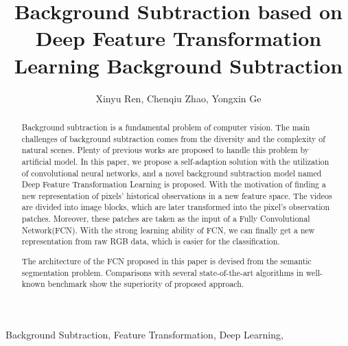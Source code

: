 \documentclass[journal]{IEEEtran}
\begin{document}
\title{Background Subtraction based on Deep Feature Transformation Learning Background Subtraction}

\author{Xinyu Ren,
        Chenqiu Zhao,
		Yongxin Ge }


\maketitle


\begin{abstract}
Background subtraction is a fundamental problem of computer vision.
The main challenges of background subtraction comes from the diversity and the complexity of natural scenes.
Plenty of previous works are proposed to handle this problem by artificial model.
In this paper,
we propose a self-adaption solution with the utilization of convolutional neural networks, 
and a novel background subtraction model named Deep Feature Transformation Learning is proposed.
With the motivation of finding a new representation of pixels’ historical observations in a new feature space.
The videos are divided into image blocks, which are later transformed into the pixel’s observation patches.
Moreover, these patches are taken as the input of a Fully Convolutional Network(FCN). 
With the strong learning ability of FCN, we can finally get a new representation from raw RGB data, which is easier for the classification.

The architecture of the FCN proposed in this paper is devised from the semantic segmentation problem.
Comparisons with several state-of-the-art algorithms in well-known benchmark show the superiority of proposed approach.
\end{abstract}

\begin{IEEEkeywords} 
    Background Subtraction, Feature Transformation, Deep Learning,
\end{IEEEkeywords}

\IEEEpeerreviewmaketitle
\end{document}
